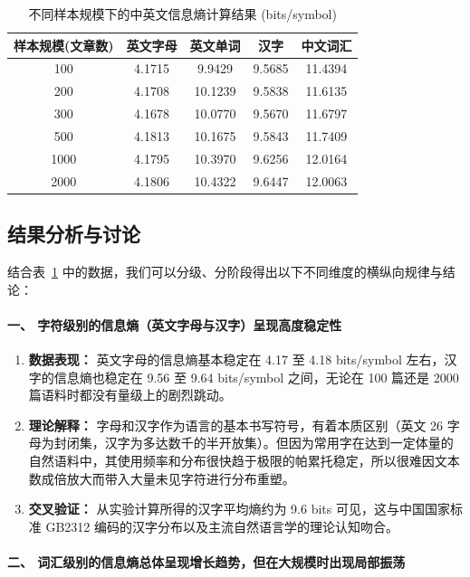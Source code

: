 \documentclass[11pt]{article}
\begin{document}
\begin{table}[htbp]
    \centering
    \caption{不同样本规模下的中英文信息熵计算结果 (bits/symbol)}
    \begin{tabular}{ccccc}
        \toprule
        \textbf{样本规模(文章数)} & \textbf{英文字母} & \textbf{英文单词} & \textbf{汉字} & \textbf{中文词汇} \\
        \midrule
        100 & 4.1715 & 9.9429 & 9.5685 & 11.4394 \\
        200 & 4.1708 & 10.1239 & 9.5838 & 11.6135 \\
        300 & 4.1678 & 10.0770 & 9.5670 & 11.6797 \\
        500 & 4.1813 & 10.1675 & 9.5843 & 11.7409 \\
        1000 & 4.1795 & 10.3970 & 9.6256 & 12.0164 \\
        2000 & 4.1806 & 10.4322 & 9.6447 & 12.0063 \\
        \bottomrule
    \end{tabular}
    \label{tab:entropy}
\end{table}

\subsection{结果分析与讨论}
结合表~\ref{tab:entropy} 中的数据，我们可以分级、分阶段得出以下不同维度的横纵向规律与结论：

\paragraph{一、 字符级别的信息熵（英文字母与汉字）呈现高度稳定性}
\begin{enumerate}
    \item \textbf{数据表现：} 英文字母的信息熵基本稳定在 4.17 至 4.18 bits/symbol 左右，汉字的信息熵也稳定在 9.56 至 9.64 bits/symbol 之间，无论在 100 篇还是 2000 篇语料时都没有量级上的剧烈跳动。
    \item \textbf{理论解释：} 字母和汉字作为语言的基本书写符号，有着本质区别（英文 26 字母为封闭集，汉字为多达数千的半开放集）。但因为常用字在达到一定体量的自然语料中，其使用频率和分布很快趋于极限的帕累托稳定，所以很难因文本数成倍放大而带入大量未见字符进行分布重塑。
    \item \textbf{交叉验证：} 从实验计算所得的汉字平均熵约为 9.6 bits 可见，这与中国国家标准 GB2312 编码的汉字分布以及主流自然语言学的理论认知吻合。
\end{enumerate}

\paragraph{二、 词汇级别的信息熵总体呈现增长趋势，但在大规模时出现局部振荡}
\end{document}
